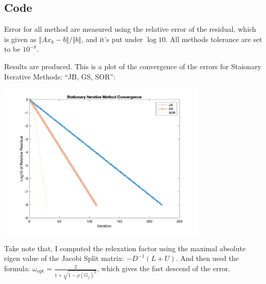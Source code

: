 \documentclass[]{article}
\begin{document}
    \subsection*{Code}
    
    
    
    Error for all method are measured using the relative error of the residual, which is given as $\Vert Ax_k -b\Vert/\Vert b\Vert$, and it's put under $\log10$. All methods tolerance are set to be $10^{-8}$. 
    \par
    Results are produced. This is a plot of the convergence of the errors for Staionary Iterative Methods: ``JB, GS, SOR'': 
    \begin{center}
        \includegraphics[width=10cm]{stationary_methods.png}
    \end{center}
    \par
    Take note that, I computed the relexation factor using the maximal absolute eigen value of the Jacobi Split matrix: $-D^{-1}(L +U)$. And then used the formula: $\omega_{\text{opt}} = \frac{2}{1 + \sqrt{1 - \rho(G_j)^2}}$, which gives the fast descend of the error. 
\end{document}
